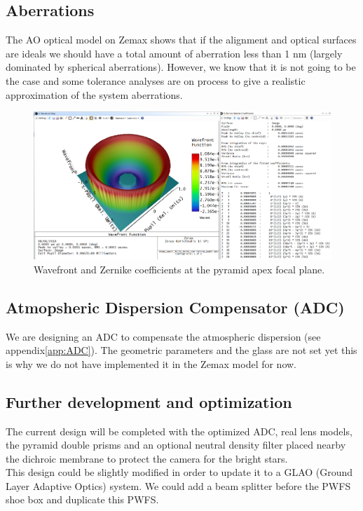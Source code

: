 \documentclass[12pt,a4paper]{article}
\begin{document}
\subsection{Aberrations}
The AO optical model on Zemax shows that if the alignment and optical surfaces are ideals we should have a total amount of aberration less than 1 nm (largely dominated by spherical aberrations). However, we know that it is not going to be the case and some tolerance analyses are on process to give a realistic approximation of the system aberrations.
\begin{figure}[H]
	\begin{center}
		\includegraphics[width=.8\textwidth]{images/WF_aberrations.PNG}
		\caption{Wavefront and Zernike coefficients at the pyramid apex focal plane.}\label{fig:WF_aberrations}
	\end{center}
\end{figure}

\subsection{Atmopsheric Dispersion Compensator (ADC)}\label{subsec:ADC}
We are designing an ADC to compensate the atmospheric dispersion (see appendix\ref{app:ADC}). The geometric parameters and the glass are not set yet this is why we do not have implemented it in the Zemax model for now.

\subsection{Further development and optimization}
The current design will be completed with the optimized ADC, real lens models, the pyramid double prisms and an optional neutral density filter placed nearby the dichroic membrane to protect the camera for the bright stars.\\
This design could be slightly modified in order to update it to a GLAO (Ground Layer Adaptive Optics) system. We could add a beam splitter before the PWFS shoe box and duplicate this PWFS.

\newpage

\renewcommand{\bibname}{References}


\end{document}
